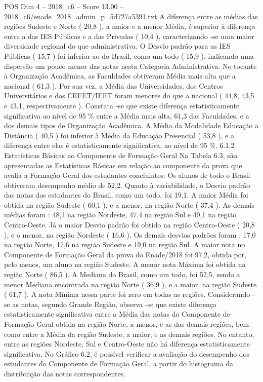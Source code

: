 \begin{textsample}{POS Dim 4 – 2018\_c6 – Score 13.00 – 2018\_c6/enade\_2018\_admin\_p\_5d727a5391.txt}
A diferença entre as médias das regiões Sudeste e Norte ( 20,8 ), a maior e a menor Média, é superior à diferença entre a das IES Públicas e a das Privadas ( 10,4 ), caracterizando -se uma maior diversidade regional do que administrativa.
O Desvio padrão para as IES Públicas ( 15,7 ) foi inferior ao do Brasil, como um todo ( 15,9 ), indicando uma dispersão um pouco menor das notas nesta Categoria Administrativa.
No tocante à Organização Acadêmica, as Faculdades obtiveram Média mais alta que a nacional ( 61,3 ).
Por sua vez, a Média das Universidades, dos Centros Universitários e dos CEFET/IFET foram menores do que a nacional ( 44,8, 43,5 e 43,1, respectivamente ).
Constata -se que existe diferença estatisticamente significativa ao nível de 95 \% entre a Média mais alta, 61,3 das Faculdades, e a dos demais tipos de Organização Acadêmica.
A Média da Modalidade Educação a Distância ( 40,5 ) foi inferior à Média da Educação Presencial ( 53,8 ), e a diferença entre elas é estatisticamente significativa, ao nível de 95 \%. 6.1.2 Estatísticas Básicas no Componente de Formação Geral Na Tabela 6.3, são apresentadas as Estatísticas Básicas em relação ao componente da prova que avalia a Formação Geral dos estudantes concluintes.
Os alunos de todo o Brasil obtiveram desempenho médio de 52,2.
Quanto à variabilidade, o Desvio padrão das notas dos estudantes do Brasil, como um todo, foi 19,1.
A maior Média foi obtida na região Sudeste ( 60,1 ), e a menor, na região Norte ( 37,4 ).
As demais médias foram : 48,1 na região Nordeste, 47,4 na região Sul e 49,1 na região Centro-Oeste.
Já o maior Desvio padrão foi obtido na região Centro-Oeste ( 20,8 ), e o menor, na região Nordeste ( 16,6 ).
Os demais desvios padrões foram : 17,0 na região Norte, 17,6 na região Sudeste e 19,0 na região Sul.
A maior nota no Componente de Formação Geral da prova do Enade/2018 foi 97,2, obtida por, pelo menos, um aluno na região Sudeste.
A menor nota Máxima foi obtida na região Norte ( 86,5 ).
A Mediana do Brasil, como um todo, foi 52,5, sendo a menor Mediana encontrada na região Norte ( 36,9 ), e a maior, na região Sudeste ( 61,7 ).
A nota Mínima nessa parte foi zero em todas as regiões.
Considerando -se as notas, segundo Grande Região, observa -se que existe diferença estatisticamente significativa entre a Média das notas do Componente de Formação Geral obtida na região Norte, a menor, e as das demais regiões, bem como entre a Média da região Sudeste, a maior, e as demais regiões.
No entanto, entre as regiões Nordeste, Sul e Centro-Oeste não há diferença estatisticamente significativa.
No Gráfico 6.2, é possível verificar a avaliação do desempenho dos estudantes do Componente de Formação Geral, a partir do histograma da distribuição das notas correspondentes.

\end{textsample}
